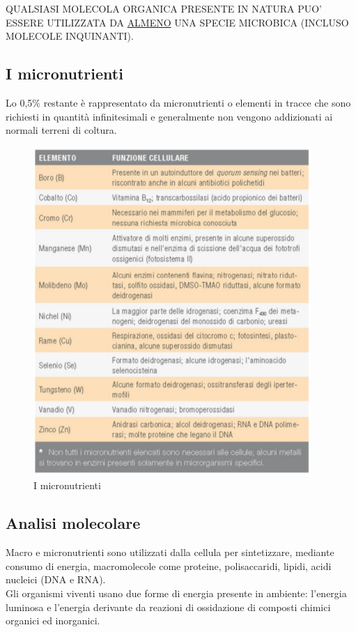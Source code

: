 \documentclass[11pt]{book}
\begin{document}
QUALSIASI MOLECOLA ORGANICA PRESENTE IN NATURA PUO’ ESSERE UTILIZZATA DA \underline{ALMENO} UNA SPECIE MICROBICA (INCLUSO MOLECOLE INQUINANTI).


\subsection{I micronutrienti}
Lo 0,5$\%$ restante è rappresentato da micronutrienti o elementi in tracce che sono richiesti in quantità infinitesimali e generalmente non vengono addizionati ai normali terreni di coltura.

\clearpage
\begin{figure}[htp]
\centering
\includegraphics[scale=0.5]{img/Micronutrienti.png}
\caption{I micronutrienti}
\label{}
\end{figure}


\subsection{Analisi molecolare}
Macro e micronutrienti sono utilizzati dalla cellula per sintetizzare, mediante consumo di energia, macromolecole come proteine, polisaccaridi, lipidi, acidi nucleici (DNA e RNA).\\
Gli organismi viventi usano due forme di energia presente in ambiente: l’energia luminosa e l’energia derivante da reazioni di ossidazione di composti chimici organici ed inorganici.
\end{document}
